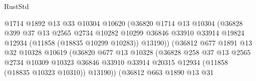 \begin{lexlean}{RustStd}
\begin{coremodule}
                                    @1714
                                    @1892
                                    @13
                                    @33
                                    @10304
                                    @10620
                                    (@36820
                                      @1714
                                      @13
                                      @10304
                                      (@36828
                                        @399
                                        @37
                                        @13
                                        @2565
                                        @2734
                                        @10282
                                        @10299
                                        @36846
                                        @33910
                                        @33914
                                        @19824
                                        @12934
                                        (@11858 (@18835 @10299 @10283))
                                        @13190))
                                    (@36812
                                      @677
                                      @1891
                                      @13
                                      @32
                                      @10328
                                      @10619
                                      (@36820
                                        @677
                                        @13
                                        @10328
                                        (@36828
                                          @258
                                          @37
                                          @13
                                          @2565
                                          @2734
                                          @10309
                                          @10323
                                          @36846
                                          @33910
                                          @33914
                                          @20315
                                          @12934
                                          (@11858 (@18835 @10323 @10310))
                                          @13190))
                                      (@36812
                                        @663
                                        @1890
                                        @13
                                        @31

\end{coremodule}
\end{lexlean}
